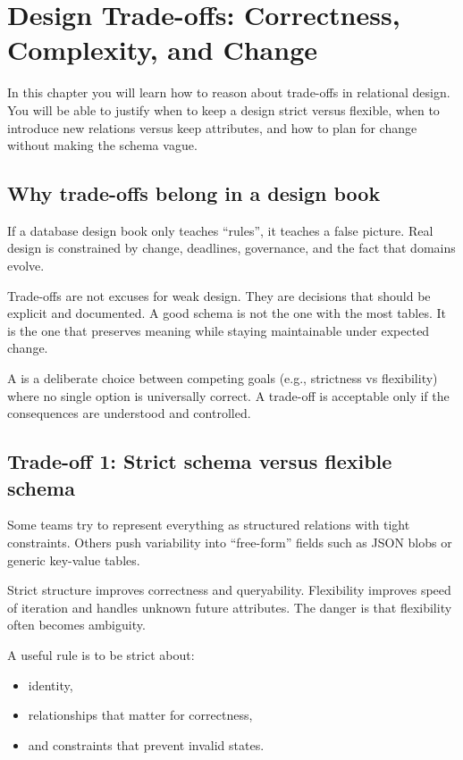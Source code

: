 \chapter{Design Trade-offs: Correctness, Complexity, and Change}

\begin{learningobjectives}
In this chapter you will learn how to reason about trade-offs in relational design.
You will be able to justify when to keep a design strict versus flexible, when to introduce new relations versus keep attributes, and how to plan for change without making the schema vague.
\end{learningobjectives}

\section{Why trade-offs belong in a design book}
If a database design book only teaches “rules”, it teaches a false picture.
Real design is constrained by change, deadlines, governance, and the fact that domains evolve.

Trade-offs are not excuses for weak design.
They are decisions that should be explicit and documented.
A good schema is not the one with the most tables.
It is the one that preserves meaning while staying maintainable under expected change.

\begin{definitionbox}
A  is a deliberate choice between competing goals (e.g., strictness vs flexibility) where no single option is universally correct.
A trade-off is acceptable only if the consequences are understood and controlled.
\end{definitionbox}

\section{Trade-off 1: Strict schema versus flexible schema}
Some teams try to represent everything as structured relations with tight constraints.
Others push variability into “free-form” fields such as JSON blobs or generic key-value tables.

Strict structure improves correctness and queryability.
Flexibility improves speed of iteration and handles unknown future attributes.
The danger is that flexibility often becomes ambiguity.

A useful rule is to be strict about:
\begin{itemize}[leftmargin=*,nosep]
  \item identity,
  \item relationships that matter for correctness,
  \item and constraints that prevent invalid states.
\end{itemize}

